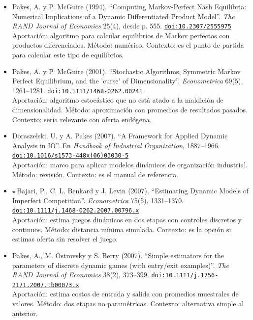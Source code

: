 \documentclass[11pt]{article}
\begin{document}
\begin{itemize}
\item Pakes, A. y P. McGuire (1994). ``Computing Markov-Perfect Nash Equilibria: Numerical Implications of a Dynamic Differentiated Product Model''. \textit{The RAND Journal of Economics} 25(4), desde p. 555. \href{https://doi.org/10.2307/2555975}{\texttt{doi:10.2307/2555975}}\\
Aportación: algoritmo para calcular equilibrios de Markov perfectos con productos diferenciados. Método: numérico. Contexto: es el punto de partida para calcular este tipo de equilibrios.
\item Pakes, A. y P. McGuire (2001). ``Stochastic Algorithms, Symmetric Markov Perfect Equilibrium, and the 'curse' of Dimensionality''. \textit{Econometrica} 69(5), 1261--1281. \href{https://doi.org/10.1111/1468-0262.00241}{\texttt{doi:10.1111/1468-0262.00241}}\\
Aportación: algoritmo estocástico que no está atado a la maldición de dimensionalidad. Método: aproximación con promedios de resultados pasados. Contexto: sería relevante con oferta endógena.
\item Doraszelski, U. y A. Pakes (2007). ``A Framework for Applied Dynamic Analysis in IO''. En \textit{Handbook of Industrial Organization}, 1887--1966. \href{https://doi.org/10.1016/s1573-448x(06)03030-5}{\texttt{doi:10.1016/s1573-448x(06)03030-5}}\\
Aportación: marco para aplicar modelos dinámicos de organización industrial. Método: revisión. Contexto: es el manual de referencia.
\item $\star$\,Bajari, P., C. L. Benkard y J. Levin (2007). ``Estimating Dynamic Models of Imperfect Competition''. \textit{Econometrica} 75(5), 1331--1370. \href{https://doi.org/10.1111/j.1468-0262.2007.00796.x}{\texttt{doi:10.1111/j.1468-0262.2007.00796.x}}\\
Aportación: estima juegos dinámicos en dos etapas con controles discretos y continuos. Método: distancia mínima simulada. Contexto: es la opción si estimas oferta sin resolver el juego.
\item Pakes, A., M. Ostrovsky y S. Berry (2007). ``Simple estimators for the parameters of discrete dynamic games (with entry/exit examples)''. \textit{The RAND Journal of Economics} 38(2), 373--399. \href{https://doi.org/10.1111/j.1756-2171.2007.tb00073.x}{\texttt{doi:10.1111/j.1756-2171.2007.tb00073.x}}\\
Aportación: estima costos de entrada y salida con promedios muestrales de valores. Método: dos etapas no paramétricas. Contexto: alternativa simple al anterior.

\end{itemize}
\end{document}
